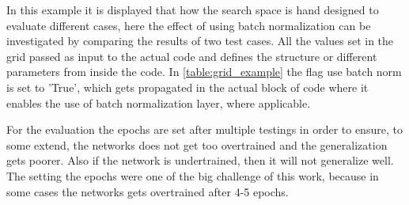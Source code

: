 In this example it is displayed that how the search space is hand designed to evaluate different cases, here the effect of using batch normalization can be investigated by comparing the results of two test cases.
All the values set in the grid passed as input to the actual code and defines the structure or different parameters from inside  the code. In \ref{table:grid_example} the flag use batch norm is set to 'True', which
gets propagated in the actual block of code where it enables the use of batch normalization layer, where applicable. 

For the evaluation the epochs are set after multiple testings in order to ensure, to some extend, the networks does not get too overtrained and the generalization gets poorer. Also if the network is undertrained, then 
it will not generalize well. The setting the epochs were one of the big challenge of this work, because in some cases the networks gets overtrained after 4-5 epochs.


